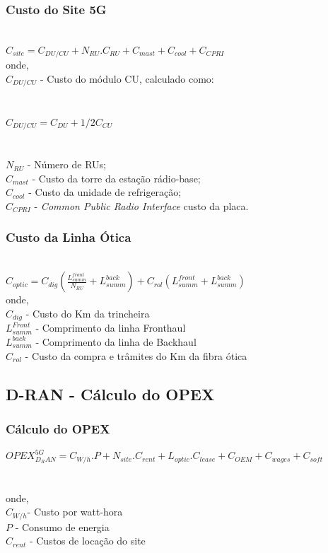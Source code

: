 \documentclass[t]{beamer}
\begin{document}
{%
\begin{frame}
\frametitle{Custo do Site 5G}\\
$C_{site}=C_{DU/CU}+N_{RU}.C_{RU}+C_{mast}+C_{cool}+C_{CPRI}$\\
\vspace{1cm}
onde,\\
$C_{DU/CU}$ - Custo do módulo CU, calculado como:\\
\\~\\
\hspace{1cm} $C_{DU/CU}=C_{DU}+1/2 C_{CU}$\\
\\~\\
$N_{RU}$ - Número de RUs;\\
$C_{mast}$ - Custo da torre da estação rádio-base;\\
$C_{cool}$ - Custo da unidade de refrigeração;\\
$C_{CPRI}$ - \textit{Common Public Radio Interface} custo da placa.\\
\end{frame}

\begin{frame}
\frametitle{Custo da Linha Ótica}\\
$C_{optic}=C_{dig} (\frac{L_{summ}^{front}}{N_{RU}}+L_{summ}^{back})+ C_{rol}(L_{summ}^{front}+L_{summ}^{back})$\\
\vspace{1cm}
onde,\\
$C_{dig}$ - Custo do Km da trincheira\\
$L_{summ}^{Front}$ - Comprimento da linha Fronthaul\\
$L_{summ}^{back}$ - Comprimento da linha de Backhaul\\
$C_{rol}$ - Custo da compra e trâmites do Km da fibra ótica\\
\end{frame}


 \subsection{D-RAN - Cálculo do OPEX}
\begin{frame}
\frametitle{Cálculo do OPEX}
\footnotesize
 $OPEX_{D_RAN}^{5G}= C_{W/h}.P + N_{site}.C_{rent}+L_{optic}.C_{lease}+C_{OEM}+C_{wages}+C_{soft}$\\
\\~\\
 onde,\\
 $C_{W/h} $- Custo por watt-hora\\
 $P  $    - Consumo de energia\\
 $C_{rent}$ - Custos de locação do site\\
 


\end{frame}}
\end{document}
